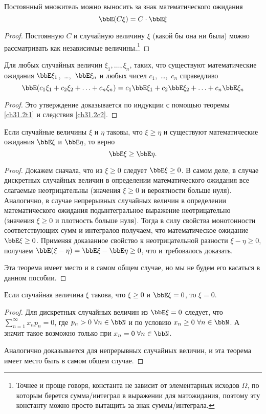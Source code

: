 \begin{cons}\label{ch31.2c2}
Постоянный множитель можно выносить за знак математического ожидания
$$
\bbE(C\xi)=C\cdot \bbE\xi
$$
\end{cons}
\begin{proof}
Постоянную $C$ и случайную величину $\xi$ (какой бы она ни была) можно рассматривать как независимые величины.\footnote{Точнее и проще говоря, константа не зависит от элементарных исходов $\Omega$, по которым берется сумма/интеграл в выражении для матожидания, поэтому эту константу можно просто вытащить за знак суммы/интеграла.}
\end{proof}
\begin{cons}[линейность] Для любых случайных величин $\xi_1,\dots,\xi_n$, таких, что существуют математические ожидания $\bbE\xi_1$,~\dots,~$\bbE\xi_n$ и любых чисел $c_1$,~\dots,~$c_n$ справедливо
$$
\bbE(c_1\xi_1+c_2\xi_2+\ldots+c_n\xi_n) = c_1\bbE\xi_1+c_2\bbE\xi_2+\ldots+c_n\bbE\xi_n
$$
\end{cons}
\begin{proof} Это утверждение доказывается по индукции с помощью теоремы \ref{ch31.2t1} и следствия \ref{ch31.2c2}.
\end{proof}
\begin{thm}[монотонность] \label{ch31.2t4}
Если случайные величины $\xi$ и $\eta$ таковы, что $\xi \ge\eta$ и существуют математические ожидания $\bbE\xi$ и $\bbE\eta$, то верно
$$
\bbE\xi\ge \bbE\eta.
$$
\end{thm}
\begin{proof}
Докажем сначала, что из $\xi\ge 0$ следует $\bbE\xi\ge0$. В самом деле, в случае дискретных случайных величин в определении математического ожидания все слагаемые неотрицательны (значения $\xi \ge 0$ и вероятности больше нуля). Аналогично, в случае непрерывных случайных величин в определении математического ожидания подынтегральное выражение неотрицательно (значения $\xi \ge 0$ и плотность больше нуля). Тогда в силу свойства монотонности соответствующих сумм и интегралов получаем, что математическое ожидание $\bbE\xi \ge 0$. Применяя доказанное свойство к неотрицательной разности $\xi-\eta \ge 0$, получаем $\bbE(\xi-\eta)=\bbE\xi-\bbE\eta\ge0$, что и требовалось доказать.

Эта теорема имеет место и в самом общем случае, но мы не будем его касаться в данном пособии.
\end{proof}
\begin{thm}\label{ch31.2t3}
Если случайная величина $\xi$ такова, что $\xi\ge 0$ и $\bbE\xi=0$, то $\xi=0$.
\end{thm}
\begin{proof}
Для дискретных случайных величин из $\bbE\xi=0$ следует, что $\sum\limits_{n=1}^{\infty} x_n p_n = 0$, где $p_n > 0 \ \forall n\in \bbN$ и по условию $x_n \ge 0 \ \forall n\in \bbN$. А значит такое возможно только при $x_n = 0 \; \forall n\in \bbN$.

Аналогично доказывается для непрерывных случайных величин, и эта теорема имеет место быть в самом общем случае.
\end{proof}


